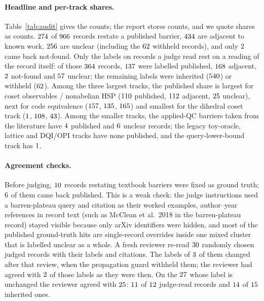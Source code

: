 \documentclass[10pt]{article}
\begin{document}
\paragraph{Headline and per-track shares.} Table~\ref{tab:audit} gives the counts; the report stores counts, and we quote shares as counts. $274$ of $966$ records restate a published barrier, $434$ are adjacent to known work, $256$ are unclear (including the $62$ withheld records), and only $2$ came back not-found. Only the labels on records a judge read rest on a reading of the record itself: of those $364$ records, $137$ were labelled published, $168$ adjacent, $2$ not-found and $57$ unclear; the remaining labels were inherited ($540$) or withheld ($62$). Among the three largest tracks, the published share is largest for coset observables / nonabelian HSP ($110$ published, $112$ adjacent, $25$ unclear), next for code equivalence ($157$, $135$, $165$) and smallest for the dihedral coset track ($1$, $108$, $43$). Among the smaller tracks, the applied-QC barriers taken from the literature have $4$ published and $6$ unclear records; the legacy toy-oracle, lattice and DQI/OPI tracks have none published, and the query-lower-bound track has $1$.

\paragraph{Agreement checks.} Before judging, $10$ records restating textbook barriers were fixed as ground truth; $6$ of them came back published. This is a weak check: the judge instructions used a barren-plateau query and citation as their worked examples, author--year references in record text (such as McClean et al.\ 2018 in the barren-plateau record) stayed visible because only arXiv identifiers were hidden, and most of the published ground-truth hits are single-record overrides inside one mixed cluster that is labelled unclear as a whole. A fresh reviewer re-read $30$ randomly chosen judged records with their labels and citations. The labels of $3$ of them changed after that review, when the propagation guard withheld them; the reviewer had agreed with $2$ of those labels as they were then. On the $27$ whose label is unchanged the reviewer agreed with $25$: $11$ of $12$ judge-read records and $14$ of $15$ inherited ones.
\end{document}

